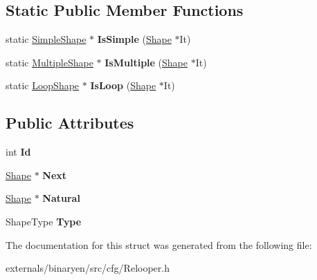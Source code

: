 \subsection*{Static Public Member Functions}
\begin{DoxyCompactItemize}
\item 
\mbox{\label{struct_c_f_g_1_1_shape_aa146217106aebc1e52793d8a79e23a60}} 
static \mbox{\hyperlink{struct_c_f_g_1_1_simple_shape}{Simple\+Shape}} $\ast$ {\bfseries Is\+Simple} (\mbox{\hyperlink{struct_c_f_g_1_1_shape}{Shape}} $\ast$It)
\item 
\mbox{\label{struct_c_f_g_1_1_shape_a66d7598e941870edd7b04088e7bb4f70}} 
static \mbox{\hyperlink{struct_c_f_g_1_1_multiple_shape}{Multiple\+Shape}} $\ast$ {\bfseries Is\+Multiple} (\mbox{\hyperlink{struct_c_f_g_1_1_shape}{Shape}} $\ast$It)
\item 
\mbox{\label{struct_c_f_g_1_1_shape_aeeda47b71561bd61b03970b5de1dc4f4}} 
static \mbox{\hyperlink{struct_c_f_g_1_1_loop_shape}{Loop\+Shape}} $\ast$ {\bfseries Is\+Loop} (\mbox{\hyperlink{struct_c_f_g_1_1_shape}{Shape}} $\ast$It)
\end{DoxyCompactItemize}
\subsection*{Public Attributes}
\begin{DoxyCompactItemize}
\item 
\mbox{\label{struct_c_f_g_1_1_shape_ac08f8ae8850e28a79eee4d88f3fa36bb}} 
int {\bfseries Id}
\item 
\mbox{\label{struct_c_f_g_1_1_shape_a4cc66660dc728ceadd17052954028277}} 
\mbox{\hyperlink{struct_c_f_g_1_1_shape}{Shape}} $\ast$ {\bfseries Next}
\item 
\mbox{\label{struct_c_f_g_1_1_shape_a49ae0419a873ed7052d0941cb0534535}} 
\mbox{\hyperlink{struct_c_f_g_1_1_shape}{Shape}} $\ast$ {\bfseries Natural}
\item 
\mbox{\label{struct_c_f_g_1_1_shape_af43d7385f0d7841b681e570f73c767c4}} 
Shape\+Type {\bfseries Type}
\end{DoxyCompactItemize}


The documentation for this struct was generated from the following file\+:\begin{DoxyCompactItemize}
\item 
externals/binaryen/src/cfg/Relooper.\+h\end{DoxyCompactItemize}

